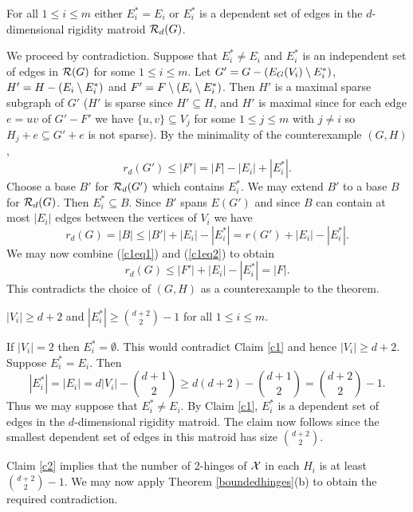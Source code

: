 \documentclass[11pt]{article}
\begin{document}
\begin{claim}\label{c1}
For all $1\leq i \leq m$ either $E_i^*=E_i$ or $E_i^*$ is a
dependent set of edges in the $d$-dimensional rigidity matroid
${\cal R}_d(G)$.
\end{claim}
\bproof We proceed by contradiction. Suppose that $E_i^*\neq E_i$
and $E_i^*$ is an independent set of edges in ${\cal R}(G)$ for some
$1\leq i\leq m$. Let $G'=G-(E_G(V_i)\setminus E_i^*)$, $H'=H-(E_i\setminus
E_i^*)$ and $F'=F\setminus(E_i\setminus E_i^*)$. Then $H'$ is a maximal sparse
subgraph of $G'$ ($H'$ is sparse since $H'\subseteq H$, and $H'$ is
maximal since for each edge $e=uv$ of $G'-F'$ we have
$\{u,v\}\subseteq V_j$ for some $1\leq j\leq m$ with $j\neq i$ so
$H_j+e\subseteq G'+e$ is not sparse). By the minimality of the
counterexample $(G,H)$,
\begin{equation}\label{c1eq1}
r_d(G')\leq |F'|=|F|-|E_i|+ |E_i^*|.
\end{equation}
Choose a base $B'$ for ${\cal R}_d(G')$ which contains $E_i^*$. We
may extend $B'$ to a base $B$ for ${\cal R}_d(G)$. Then
$E_i^*\subseteq B$. Since $B'$ spans $E(G')$ and since $B$ can
contain at most $|E_i|$ edges between the vertices of $V_i$ we have
\begin{equation}\label{c1eq2}
r_d(G)=|B|\leq |B'|+|E_i|-|E_i^*|=r(G')+|E_i|- |E_i^*|.
\end{equation}
We may now combine (\ref{c1eq1}) and (\ref{c1eq2}) to obtain
$$r_d(G)\leq |F'|+|E_i|- |E_i^*|= |F|.$$
This contradicts the choice of $(G,H)$ as a counterexample to the
theorem. \eproof

\begin{claim}\label{c2}
$|V_i|\geq d+2$ and $|E_i^*|\geq {{d+2}\choose{2}}-1$ for all $1\leq
i\leq m$.
\end{claim}
\bproof If $|V_i|=2$ then $E_i^*=\emptyset$. This would contradict
Claim \ref{c1} and hence $|V_i|\geq d+2$. Suppose $E_i^*=E_i$. Then
$$|E_i^*|=|E_i|=d|V_i|-{{d+1}\choose{2}}\geq  d(d+2)-{{d+1}\choose{2}}={{d+2}\choose{2}}-1.$$
Thus we may suppose that $E_i^*\neq E_i$. By Claim \ref{c1}, $E_i^*$
is a dependent set of edges in the $d$-dimensional rigidity matroid.
The claim now follows since the smallest dependent set of edges in
this matroid has size ${{d+2}\choose{2}}$.
\eproof

Claim \ref{c2} implies that the number of 2-hinges of ${\cal X}$ in
each $H_i$ is at least ${{d+2}\choose{2}}-1$.  We may now apply
Theorem \ref{boundedhinges}(b) to obtain the required contradiction.
\eproof
\end{document}

